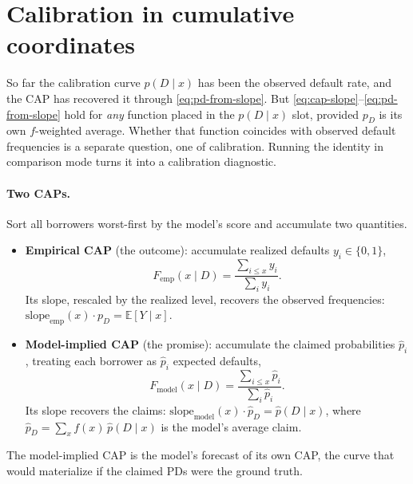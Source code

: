 \documentclass[12pt]{article}
\newcommand{\pD}{p_D}
\newcommand{\PDx}{p(D \mid x)}
\newcommand{\slope}{\mathrm{slope}}
\newcommand{\E}{\mathbb{E}}
\begin{document}
\section{Calibration in cumulative coordinates}\label{sec:calib}

So far the calibration curve $\PDx$ has been the observed default rate, and the CAP has recovered
it through \eqref{eq:pd-from-slope}. But \eqref{eq:cap-slope}--\eqref{eq:pd-from-slope} hold
for \emph{any} function placed in the $\PDx$ slot, provided $\pD$ is its own $f$-weighted
average. Whether that function coincides with observed default frequencies is a separate
question, one of calibration. Running the identity in comparison mode turns
it into a calibration diagnostic.

\paragraph{Two CAPs.} Sort all borrowers worst-first by the model's score and accumulate two
quantities.
\begin{itemize}
\item \textbf{Empirical CAP} (the outcome): accumulate realized defaults $y_i\in\{0,1\}$,
\begin{equation}
F_{\text{emp}}(x\mid D)=\frac{\sum_{i\le x}y_i}{\sum_i y_i}.
\end{equation}
Its slope, rescaled by the realized level, recovers the observed frequencies:
$\slope_{\text{emp}}(x)\cdot\pD=\E[Y\mid x]$.
\item \textbf{Model-implied CAP} (the promise): accumulate the claimed probabilities $\hat p_i$,
treating each borrower as $\hat p_i$ expected defaults,
\begin{equation}
F_{\text{model}}(x\mid D)=\frac{\sum_{i\le x}\hat p_i}{\sum_i \hat p_i}.
\end{equation}
Its slope recovers the claims: $\slope_{\text{model}}(x)\cdot\hat p_D=\hat p(D\mid x)$, where
$\hat p_D=\sum_x f(x)\,\hat p(D\mid x)$ is the model's average claim.
\end{itemize}
The model-implied CAP is the model's forecast of its own CAP, the curve that would
materialize if the claimed PDs were the ground truth.
\end{document}
